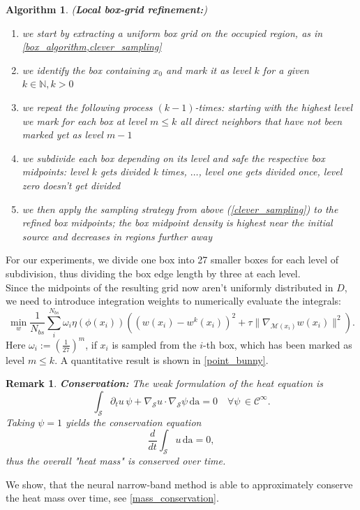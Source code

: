 \documentclass[12pt,openany]{book}
\def\S{\mathcal{S}}
\theoremstyle{plainnormal}
\newtheorem{remark}[theorem]{Remark}
\newtheorem{algorithm}[theorem]{Algorithm}
\theoremstyle{remark}
\begin{document}
\begin{algorithm}(\textbf{Local box-grid refinement:})
    \begin{enumerate}
    \item we start by extracting a uniform box grid on the occupied region, as in \cref{box_algorithm,clever_sampling}
    \item we identify the box containing $x_0$ and mark it as level $k$ for a given $k\in \mathbb N, k > 0$
    \item  we repeat the following process $(k-1)$-times: starting with the highest level we mark for each box at level $m\leq k$ all direct neighbors that have not been marked yet as level $m-1$
    \item we subdivide each box depending on its level and safe the respective box midpoints: level $k$ gets divided k times, $\dots$,  level one gets divided once, level zero doesn't get divided 
    \item we then apply the sampling strategy from above (\cref{clever_sampling}) to the refined box midpoints; the box midpoint density is highest near the initial source and decreases in regions further away
    \end{enumerate} 
\end{algorithm}
For our experiments, we divide one box into 27 smaller boxes for each level of subdivision, thus dividing the box edge length by three at each level.\\
Since the midpoints of the resulting grid now aren't uniformly distributed in $D$, we need to introduce integration weights to numerically evaluate the integrals: 
\begin{equation*}
    \min_w \frac{1}{N_{bs}} \sum_i^{N_{bs}} \omega_i \eta(\phi(x_i)) \left((w(x_i) - w^k(x_i))^2 + \tau \|\nabla_{\mathcal{M}(x_i)} w(x_i)\|^2\right).
\end{equation*}
Here $\omega_i:= (\frac{1}{27})^m$, if $x_i$ is sampled from the $i$-th box, which has been marked as level $m\leq k$. A quantitative result is shown in \cref{point_bunny}.
\begin{remark}\textbf{Conservation:}
    The weak formulation of the heat equation is \[
        \int_\mathcal{S} \partial_t u \, \psi + \nabla_\mathcal{S} u \cdot \nabla_\mathcal{S} \psi \, \mathrm{da} = 0 \quad \forall \psi\,\in \mathcal C^\infty.
    \]
    Taking $\psi = 1$ yields the conservation equation
    $$\frac{d}{dt} \int_\S  u \,\mathrm{da} = 0,$$
    thus the overall "heat mass" is conserved over time.
\end{remark}
 We show, that the neural narrow-band method is able to approximately conserve the heat mass over time, see \cref{mass_conservation}.
\end{document}
